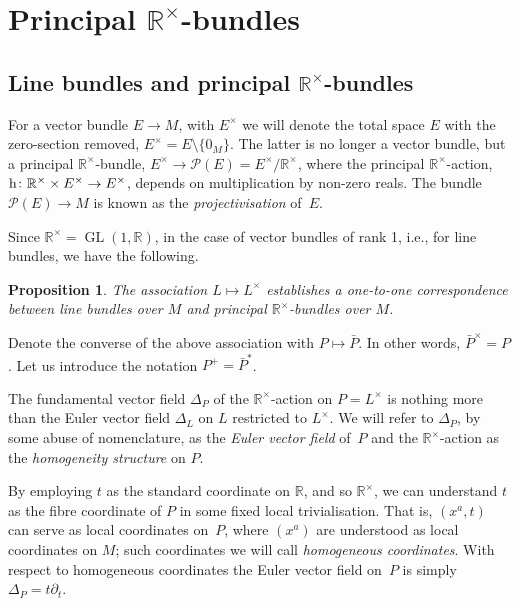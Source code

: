 \documentclass[10pt,a4paper]{amsart}
\newcommand{\rmh}{\textnormal{h}}
\DeclareMathOperator{\GL}{GL}
\newcommand{\R}{{\mathbb R}}
\newcommand{\ti}{\times}
\def\cP{\mathcal{P}}
\numberwithin{equation}{section}
\newtheorem{Proposition}[Theorem]{Proposition}
 { \theoremstyle{definition}
\newtheorem{Definition}[Theorem]{Definition}
\newtheorem{Example}[Theorem]{Example}
\newtheorem{Remark}[Theorem]{Remark} }
\begin{document}
\section[Principal $\R^\times$-bundles]{Principal $\boldsymbol{\R^\times}$-bundles}\label{sec:PrincipalRbundles}

\subsection[Line bundles and principal $\mathbb{R}^{\times}$-bundles]{Line bundles and principal $\boldsymbol{\mathbb{R}^{\times}}$-bundles}\label{subsec:Lines and R^x}

For a vector bundle $E\to M$, with $E^\ti$ we will denote the total space $E$ with the zero-section removed, $E^\ti=E\setminus\{ 0_M\}$. The latter is no longer a vector bundle, but a principal $\R^\ti$-bundle, $E^\ti\to \cP(E)=E^\ti/\R^\ti$, where the principal $\R^\ti$-action, $\rmh\colon \mathbb{R}^{\times} \times E^{\times} \rightarrow E^{\times}$, depends on multiplication by non-zero reals. The bundle $\cP(E) \rightarrow M$ is known as the \emph{projectivisation} of~$E$.

Since $\R^\ti=\GL(1,\R)$, in the case of vector bundles of rank 1, i.e., for line bundles, we have the following.
\begin{Proposition}
The association $L\mapsto L^\ti$ establishes a one-to-one correspondence between line bundles over $M$ and principal $\mathbb{R}^{\times}$-bundles over $M$.
\end{Proposition}

Denote the converse of the above association with $P\mapsto \bar P$. In other words, $\bar P^\ti=P$. Let us introduce the notation $P^+=\bar P^*$.

The fundamental vector f\/ield $\Delta_{P}$ of the $\mathbb{R}^{\times}$-action on $P = L^{\times}$ is nothing more than the Euler vector f\/ield $\Delta_{L}$ on $L$ restricted to $L^{\times}$. We will refer to $\Delta_{P}$, by some abuse of nomenclature, as the \emph{Euler vector field} of~$P$ and the $\mathbb{R}^{\times}$-action as the \emph{homogeneity structure} on $P$.

By employing $t$ as the standard coordinate on $\mathbb{R}$, and so $\mathbb{R}^{\times}$, we can understand $t$ as the f\/ibre coordinate of $P$ in some f\/ixed local trivialisation. That is, $(x^{a}, t)$ can serve as local coordinates on~$P$, where $(x^{a})$ are understood as local coordinates on $M$; such coordinates we will call \emph{homogeneous coordinates}. With respect to homogeneous coordinates the Euler vector f\/ield on~$P$ is simply $\Delta_{P} = t \partial_{t}$.
\end{document}
